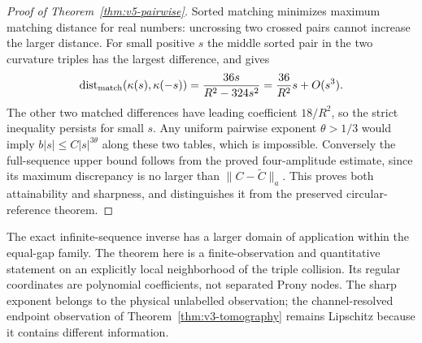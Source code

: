\begin{proof}[Proof of Theorem~\ref{thm:v5-pairwise}]
Sorted matching minimizes maximum matching distance for real numbers:
uncrossing two crossed pairs cannot increase the larger distance.
For small positive $s$ the middle sorted pair in the two curvature
triples has the largest difference, and gives
\begin{equation}\label{eq:v5-curvature-matching}
 \operatorname{dist}_{\rm match}(\kappa(s),\kappa(-s))
       =\frac{36s}{R^2-324s^2}=\frac{36}{R^2}s+O(s^3).
\end{equation}
The other two matched differences have leading coefficient $18/R^2$,
so the strict inequality persists for small $s$. Any uniform pairwise
exponent $\theta>1/3$ would imply $b|s|\le C|s|^{3\theta}$ along
these two tables, which is impossible. Conversely the full-sequence
upper bound follows from the proved four-amplitude estimate, since
its maximum discrepancy is no larger than $\|C-\widetilde C\|_a$.
This proves both attainability and sharpness, and distinguishes it
from the preserved circular-reference theorem.
\end{proof}

The exact infinite-sequence inverse has a larger domain of application
within the equal-gap family. The theorem here is a finite-observation
and quantitative statement on an explicitly local neighborhood of the
triple collision. Its regular coordinates are polynomial coefficients,
not separated Prony nodes. The sharp exponent belongs to the physical
unlabelled observation; the channel-resolved endpoint observation of
Theorem~\ref{thm:v3-tomography} remains Lipschitz because it contains
different information.
